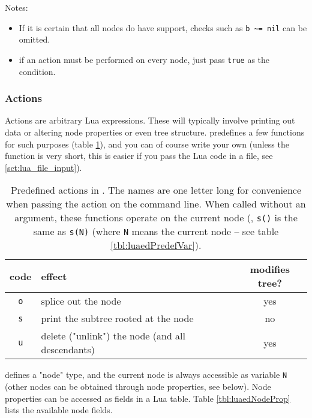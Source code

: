 Notes:
\begin{itemize}
	\item If it is certain that all nodes do have support, checks such as \verb+b ~= nil+ can be omitted. 
	\item if an action must be performed on every node, just pass \texttt{true} as
	the condition.
\end{itemize}

\subsubsection{Actions}

Actions are arbitrary Lua expressions. These will typically involve printing out
data or altering node properties or even tree structure. \luaed{} predefines a
few functions for such purposes (table \ref{tbl:luaedPredefFunc}), and you can
of course write your own (unless the function is very short, this is easier if
you pass the Lua code in a file, see \ref{sct:lua_file_input}).

\begin{table}
	\centering
	\begin{tabular}{clc}
		code & effect & modifies tree?\\
		\hline
		\texttt{o}	& splice out the node 									& yes \\
		\texttt{s}	& print the subtree rooted at the node 	& no \\
		\texttt{u} 	& delete ("unlink") the node (and all descendants) & yes
	\end{tabular}
	\caption{%
		\label{tbl:luaedPredefFunc}
		Predefined actions in \luaed. The names are one letter long for convenience
		when passing the action on the command line. When called without an
		argument, these functions operate on the current node (\ie, \texttt{s()} is
		the same as \texttt{s(N)} (where \texttt{N} means the current node -- see
		table \ref{tbl:luaedPredefVar}).
	}
\end{table}

\sched{} defines a "node" type, and the current node is always accessible as
variable \texttt{N} (other nodes can be obtained through node properties, see
below).  Node properties can be accessed as fields in a Lua table. Table \ref{tbl:luaedNodeProp} lists the available node
fields.

